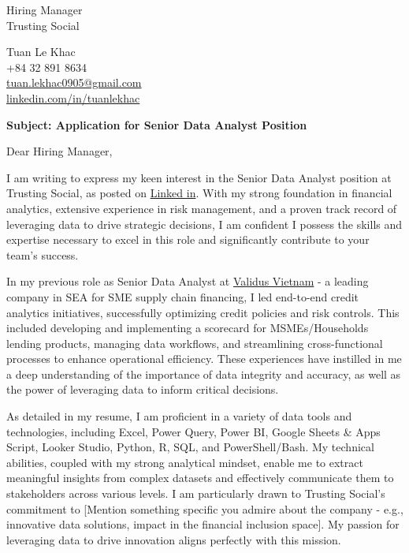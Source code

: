 \documentclass[11pt, letterpaper]{article}
\begin{document}
\thispagestyle{empty}

\noindent
\parbox[t]{0.45\textwidth}{\begin{flushleft}
Hiring Manager \\
Trusting Social
\end{flushleft}}
\hfill
\parbox[t]{0.45\textwidth}{\begin{flushright}
Tuan Le Khac \\
+84 32 891 8634 \\
\href{mailto:tuan.lekhac0905@gmail.com}{tuan.lekhac0905@gmail.com} \\
\href{https://linkedin.com/in/tuanlekhac}{linkedin.com/in/tuanlekhac}
\end{flushright}}


\noindent
\textbf{Subject: Application for Senior Data Analyst Position}

\vspace{0.2in}

Dear Hiring Manager,

\vspace{0.1in}
I am writing to express my keen interest in the Senior Data Analyst position at Trusting Social, as posted on \href{https://www.linkedin.com/jobs/view/4107882329}{Linked in}. With my strong foundation in financial analytics, extensive experience in risk management, and a proven track record of leveraging data to drive strategic decisions, I am confident I possess the skills and expertise necessary to excel in this role and significantly contribute to your team's success.

\vspace{0.1in}

In my previous role as Senior Data Analyst at \href{https://validus.vn/en/about-validus/}{Validus Vietnam} - a leading company in SEA for SME supply chain financing, I led end-to-end credit analytics initiatives, successfully optimizing credit policies and risk controls. This included developing and implementing a scorecard for MSMEs/Households lending products, managing data workflows, and streamlining cross-functional processes to enhance operational efficiency. These experiences have instilled in me a deep understanding of the importance of data integrity and accuracy, as well as the power of leveraging data to inform critical decisions.

\vspace{0.1in}

As detailed in my resume, I am proficient in a variety of data tools and technologies, including Excel, Power Query, Power BI, Google Sheets \& Apps Script, Looker Studio, Python, R, SQL, and PowerShell/Bash. My technical abilities, coupled with my strong analytical mindset, enable me to extract meaningful insights from complex datasets and effectively communicate them to stakeholders across various levels. I am particularly drawn to Trusting Social's commitment to [Mention something specific you admire about the company - e.g., innovative data solutions, impact in the financial inclusion space]. My passion for leveraging data to drive innovation aligns perfectly with this mission.
\end{document}
